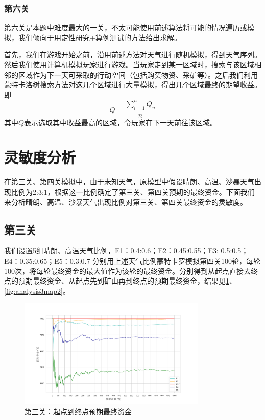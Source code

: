 \documentclass[withoutpre]{cumcmthesis} %
\begin{document}
\subsubsection{第六关}
第六关是本题中难度最大的一关，不太可能使用前述算法将可能的情况遍历或模拟，我们倾向于用定性研究+算例测试的方法给出求解。

首先，我们在游戏开始之前，沿用前述方法对天气进行随机模拟，得到天气序列。然后我们使用计算机模拟玩家进行游戏。当玩家走到某一区域时，搜索与该区域相邻的区域作为下一天可采取的行动空间（包括购买物资、采矿等）。之后我们利用蒙特卡洛树搜索方法对这几个区域进行大量模拟，得出几个区域最终的期望收益。即
\begin{equation}
	\bar{Q}=\displaystyle\frac{\sum_{i=1}^{n}Q_n}{n}
\end{equation}
其中$\bar{Q}$表示选取其中收益最高的区域，令玩家在下一天前往该区域。


\section{灵敏度分析}
在第三关、第四关模拟中，由于未知天气，原模型中假设晴朗、高温、沙暴天气出现比例为2:3:1，根据这一比例确定了第三关、第四关预期的最终资金。下面我们来分析晴朗、高温、沙暴天气出现比例对第三关、第四关最终资金的灵敏度。

\subsection{第三关}
我们设置5组晴朗、高温天气比例，E1：0.4:0.6；E2：0.45:0.55；E3: 0.5:0.5；E4：0.35:0.65；E5：0.3:0.7
分别用上述天气比例蒙特卡罗模拟第四关100轮，每轮100次，将每轮最终资金的最大值作为该轮的最终资金。分别得到从起点直接去终点的预期最终资金、从起点先到矿山再到终点的预期最终资金，结果见\cref{fig:analysis3map1}、\cref{fig:analysis3map2}。
\begin{figure}[H]
    \centering
    \includegraphics[width=0.8\textwidth]{figures/analysis3map1.png}
    \caption{第三关：起点到终点预期最终资金}
    \label{fig:analysis3map1}
\end{figure}
\end{document}
